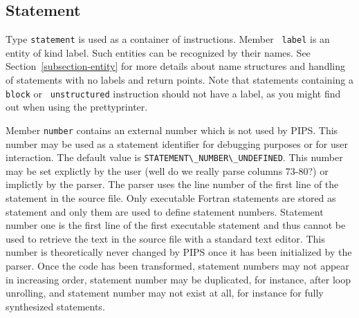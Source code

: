 {\iffalse
Le domaine {\tt callees} sert a` porter des informations
interproce'durales, et sera enrichi dans le futur.  Le sous-domaine {\tt
callees} contient la liste des noms des sous-programmes et fonctions
directement appele's dans le code. Il contient une partie du callgraph.
\fi

\subsection{Statement}
\label{subsection-statement}

{}

Type {\tt statement} is used as a container of instructions. Member {\tt
label} is an entity of kind label. Such entities can be recognized by
their names. See Section~\ref{subsection-entity} for more details about
name structures and handling of statements with no labels and return
points. Note that statements containing a {\tt block} or {\tt
unstructured} instruction should not have a label, as you might find out
when using the prettyprinter.

\iffalse
Le domaine \verb/statement/ permet de
repe'rer les instructions d'un module.  Le sous-domaine \verb/label/
contient une entite' qui de'finit le label\footnote{Un statement dont
l'instruction est un \verb/block/ ou un \verb/unstructured/ n'a jamais
de label.}. Un label spe'cial est de'fini pour les RETURN, ce qui permet
de convertir les appels a` RETURN en des branchements a` ce label
spe'cial. Un autre label spe'cial, \verb/empty_label/, est utilise' pour
les statements sans label.
\fi

Member {\tt number} contains an external number which is not used by
PIPS. This number may be used as a statement identifier for debugging
purposes or for user interaction. The default value is
\verb+STATEMENT\_NUMBER\_UNDEFINED+. This number may be set explictly by
the user (well do we really parse columns 73-80?) or implictly by the
parser. The parser uses the line number of the first line of the
statement in the source file. Only executable Fortran statements are
stored as statement and only them are used to define statement
numbers. Statement number one is the first line of the first executable
statement and thus cannot be used to retrieve the text in the source
file with a standard text editor. This number is theoretically never
changed by PIPS once it has been initialized by the parser. Once the
code has been transformed, statement numbers may not appear in
increasing order, statement number may be duplicated, for instance,
after loop unrolling, and statement number may not exist at all, for
instance for fully synthesized statements.

}
